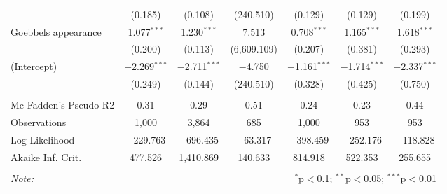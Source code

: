 \begin{table}[t!]
\begin{tabular}{@{\extracolsep{1pt}}lcccccc}
  & (0.185) & (0.108) & (240.510) & (0.129) & (0.129) & (0.199) \\ 
  Goebbels appearance & 1.077$^{***}$ & 1.230$^{***}$ & 7.513 & 0.708$^{***}$ & 1.165$^{***}$ & 1.618$^{***}$ \\ 
  & (0.200) & (0.113) & (6,609.109) & (0.207) & (0.381) & (0.293) \\ 
  (Intercept) & $-$2.269$^{***}$ & $-$2.711$^{***}$ & $-$4.750 & $-$1.161$^{***}$ & $-$1.714$^{***}$ & $-$2.337$^{***}$ \\ 
  & (0.249) & (0.144) & (240.510) & (0.328) & (0.425) & (0.750) \\ 
 \hline \\[-1.8ex] 
Mc-Fadden's Pseudo R2 & 0.31 & 0.29 & 0.51 & 0.24 & 0.23 & 0.44 \\ 
Observations & 1,000 & 3,864 & 685 & 1,000 & 953 & 953 \\ 
Log Likelihood & $-$229.763 & $-$696.435 & $-$63.317 & $-$398.459 & $-$252.176 & $-$118.828 \\ 
Akaike Inf. Crit. & 477.526 & 1,410.869 & 140.633 & 814.918 & 522.353 & 255.655 \\ 
\hline 
\hline \\[-1.8ex] 
\textit{Note:}  & \multicolumn{6}{r}{$^{*}$p$<$0.1; $^{**}$p$<$0.05; $^{***}$p$<$0.01} \\ 
\end{tabular} 
\end{table} 
